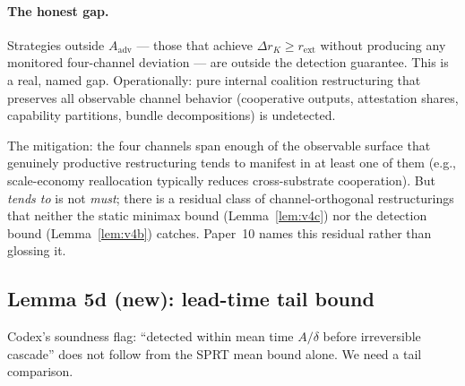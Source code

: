 \documentclass{article}
\newcommand{\rext}{r_{\mathrm{ext}}}
\begin{document}
\paragraph{The honest gap.}
Strategies outside $A_{\mathrm{adv}}$ --- those that achieve $\Delta r_K
\geq \rext$ without producing any monitored four-channel deviation ---
are outside the detection guarantee.  This is a real, named gap.
Operationally: pure internal coalition restructuring that preserves
all observable channel behavior (cooperative outputs, attestation
shares, capability partitions, bundle decompositions) is undetected.

The mitigation: the four channels span enough of the observable surface
that genuinely productive restructuring tends to manifest in at least
one of them (e.g., scale-economy reallocation typically reduces
cross-substrate cooperation).  But \emph{tends to} is not \emph{must};
there is a residual class of channel-orthogonal restructurings that
neither the static minimax bound (Lemma~\ref{lem:v4c}) nor the
detection bound (Lemma~\ref{lem:v4b}) catches.  Paper~10 names this
residual rather than glossing it.

\subsection{Lemma 5d (new): lead-time tail bound}

Codex's soundness flag: ``detected within mean time $A/\delta$ before
irreversible cascade'' does not follow from the SPRT mean bound alone.
We need a tail comparison.
\end{document}

